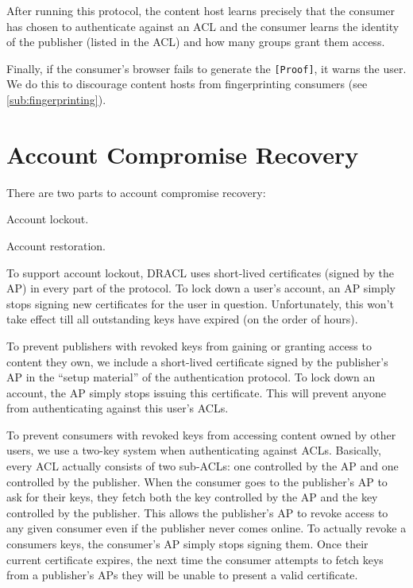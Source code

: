 \documentclass[pdftex,12pt,a4papaer]{report}
\begin{document}
After running this protocol, the content host learns precisely that the consumer
has chosen to authenticate against an ACL and the consumer learns the identity
of the publisher (listed in the ACL) and how many groups grant them access.

Finally, if the consumer's browser fails to generate the \verb=[Proof]=, it
warns the user. We do this to discourage content hosts from fingerprinting
consumers (see \ref{sub:fingerprinting}).

\section{Account Compromise Recovery}

There are two parts to account compromise recovery:

\begin{compactenum}
\item Account lockout.
\item Account restoration.
\end{compactenum}

To support account lockout, DRACL uses short-lived certificates (signed by the
AP) in every part of the protocol. To lock down a user's account, an AP simply
stops signing new certificates for the user in question. Unfortunately, this
won't take effect till all outstanding keys have expired (on the order of
hours).

To prevent publishers with revoked keys from gaining or granting access to
content they own, we include a short-lived certificate signed by the publisher's AP in the ``setup material'' of the authentication protocol. To lock
down an account, the AP simply stops issuing this certificate. This will prevent
anyone from authenticating against this user's ACLs.

To prevent consumers with revoked keys from accessing content owned by other
users, we use a two-key system when authenticating against ACLs. Basically,
every ACL actually consists of two sub-ACLs: one controlled by the AP and one
controlled by the publisher. When the consumer goes to the publisher's
AP to ask for their keys, they fetch both the key controlled by the AP and the
key controlled by the publisher. This allows the publisher's AP to
revoke access to any given consumer even if the publisher never comes
online. To actually revoke a consumers keys, the consumer's AP simply stops
signing them. Once their current certificate expires, the next time the consumer
attempts to fetch keys from a publisher's APs they will be unable to present
a valid certificate.
\end{document}
